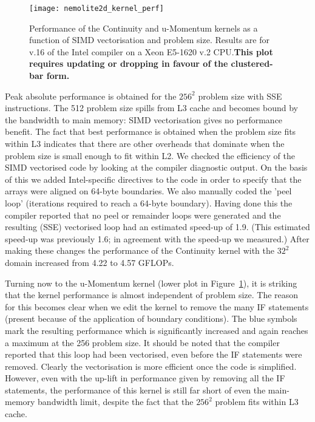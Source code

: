 \documentclass[12pt]{article}
\begin{document}
\begin{figure}
  \centering
  \texttt{[image: nemolite2d\_kernel\_perf]}
  \caption{Performance of the Continuity and u-Momentum kernels as a
    function of SIMD vectorisation and problem size. Results are for
    v.16 of the Intel compiler on a Xeon E5-1620 v.2 CPU.{\bf This plot
requires updating or dropping in favour of the clustered-bar form.}}
  \label{FIG_kernel_perf}
\end{figure}

Peak absolute performance is obtained for the $256^2$ problem size
with SSE instructions. The 512 problem size spills from L3 cache and
becomes bound by the bandwidth to main memory: SIMD vectorisation
gives no performance benefit. The fact that best performance is
obtained when the problem size fits within L3 indicates that there are
other overheads that dominate when the problem size is small enough to
fit within L2. We checked the efficiency of the SIMD vectorised code
by looking at the compiler diagnostic output. On the basis of this we
added Intel-specific directives to the code in order to specify that
the arrays were aligned on 64-byte boundaries. We also manually coded
the 'peel loop' (iterations required to reach a 64-byte
boundary). Having done this the compiler reported that no peel or
remainder loops were generated and the resulting (SSE) vectorised loop
had an estimated speed-up of 1.9. (This estimated speed-up was
previously 1.6; in agreement with the speed-up we measured.) After
making these changes the performance of the Continuity kernel with the
$32^2$ domain increased from 4.22 to 4.57 GFLOPs.

Turning now to the u-Momentum kernel (lower plot in
Figure~\ref{FIG_kernel_perf}), it is striking that the kernel
performance is almost independent of problem size. The reason for this
becomes clear when we edit the kernel to remove the many IF statements
(present because of the application of boundary conditions). The blue
symbols mark the resulting performance which is significantly
increased and again reaches a maximum at the 256 problem size.  It
should be noted that the compiler reported that this loop had been
vectorised, even before the IF statements were removed. Clearly the
vectorisation is more efficient once the code is simplified. However,
even with the up-lift in performance given by removing all the IF
statements, the performance of this kernel is still far short of even
the main-memory bandwidth limit, despite the fact that the $256^2$
problem fits within L3 cache.
\end{document}
